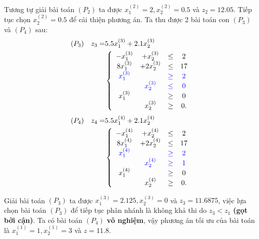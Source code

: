 \documentclass[12pt,a4paper]{report}
\begin{document}
    Tương tự giải bài toán $(P_2)$ ta được $x^{(2)}_1 = 2, x^{(2)}_2 = 0.5$ và $z_2=12.05$. Tiếp tục chọn $x^{(2)}_2 = 0.5$ để cải thiện phương án. Ta thu được 2 bài toán con $(P_3)$ và $(P_4)$ sau:
    \begin{equation*}
        \begin{split}
            (P_3) \quad z_3= & 5.5x^{(3)}_1 + 2.1x^{(3)}_2 \\
            & \left\{\begin{array} {cccc}
             -x^{(3)}_1 &+ x^{(3)}_2 &\leq& 2 \\
             8x^{(3)}_1 &+ 2x^{(3)}_2 &\leq& 17 \\
             \color{blue} x^{(3)}_1&& \color{blue}\geq &\color{blue}2 \\
             &\color{blue} x^{(3)}_2& \color{blue}\leq& \color{blue}0 \\
            x^{(3)}_1 &&\geq &0 \\
            &x^{(3)}_2 &\geq &0. \\
            \end{array}\right. \\
        \end{split}
    \end{equation*}
   \begin{equation*}
        \begin{split}
            (P_4) \quad z_4= & 5.5x^{(4)}_1 + 2.1x^{(4)}_2  \\
            & \left\{\begin{array} {cccc}
             -x^{(4)}_1 &+ x^{(4)}_2 &\leq& 2 \\
             8x^{(4)}_1 &+ 2x^{(4)}_2 &\leq& 17 \\
             \color{blue} x^{(4)}_1 &&\color{blue}\geq& \color{blue}2 \\
             &\color{blue} x^{(4)}_2 &\color{blue}\geq&\color{blue} 1 \\
            x^{(4)}_1 &&\geq& 0 \\
            &x^{(4)}_2 &\geq& 0. \\
            \end{array}\right. \\
        \end{split}
    \end{equation*}

    Giải bài toán $(P_3)$ ta được $x^{(3)}_1=2.125, x^{(3)}_2=0$ và $z_3=11.6875$, việc lựa chọn bài toán $(P_3)$ để tiếp tục phân nhánh là không khả thi do $z_3 < z_1$ \textbf{(gọt bởi cận)}. Ta có bài toán $(P_4)$ \textbf{vô nghiệm}, vậy phương án tối ưu của bài toán là $x^{(1)}_1=1, x^{(1)}_2=3$ và $z=11.8$.
\end{document}
